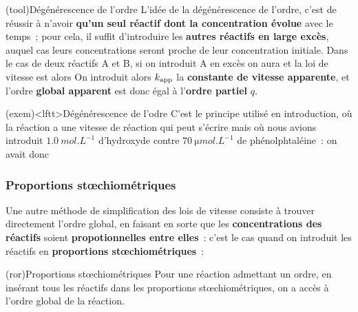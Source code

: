 \documentclass[../../main/main.tex]{subfiles}
\begin{document}
\begin{tcb*}(tool){Dégénérescence de l'ordre}
	L'idée de la dégénérescence de l'ordre, c'est de réussir à n'avoir
	\textbf{qu'un seul réactif dont la concentration évolue} avec le temps~; pour
	cela, il suffit d'introduire les \textbf{autres réactifs en large excès},
	auquel cas leurs concentrations seront proche de leur concentration initiale.
	\smallbreak
	Dans le cas de deux réactifs A et B, si on introduit A en excès on aura
	\psw{%
		\[[\ce{A}](t) \approx [\ce{A}]_0\]
	}%
	et la loi de vitesse est alors
	\psw{%
	\[
		\boxed{
		v =
		k[\ce{A}]^{p}[\ce{B}]^{q} =
		\underbracket[1pt]{k[\ce{A}]_0{}^{p}}_{= \cte}[\ce{B}]^{q} =
		k_{\rm app}[\ce{B}]^{q}
		}%
	\]
	}%
	On introduit alors $k_{\rm app}$ la \textbf{constante de vitesse apparente},
	et l'ordre \textbf{global apparent} est donc égal à l'\textbf{ordre partiel}
	$q$.
\end{tcb*}

\begin{tcb}(exem)<lftt>{Dégénérescence de l'odre}
	C'est le principe utilisé en introduction, où la réaction
	\psw{%
		\[\ce{Ph^{2-}_{\aqu} + HO^{-}_{\aqu} = PhOH^{-3}_{\aqu}}\]
	}%
	a une vitesse de réaction qui peut s'écrire
	\psw{%
		\[v = k[\ce{HO^{-}}]^{p}[\ce{Ph^{2-}}]^{q}\]
	}%
	mais où nous avions introduit $\SI{1.0}{mol.L^{-1}}$ d'hydroxyde contre
	$\SI{70}{\micro mol.L^{-1}}$ de phénolphtaléine~: on avait donc
	\psw{%
	\[
		\boxed{k_{\rm app} = k[\ce{HO^{-}}]_0^{p}}
	\]
	}%
	\vspace{-15pt}
\end{tcb}

\subsubsection{Proportions stœchiométriques}

Une autre méthode de simplification des lois de vitesse consiste à trouver
directement l'ordre global, en faisant en sorte que les \textbf{concentrations
	des réactifs} soient \textbf{propotionnelles entre elles}~: c'est le cas quand
on introduit les réactifs en \textbf{proportions stœchiométriques}~:

\begin{tcb}[label=prop:stoe, bld, cnt](ror){Proportions stœchiométriques}
	Pour une réaction admettant un ordre, en insérant tous les réactifs dans les
	proportions stœchiométriques, on a accès à l'ordre global de la réaction.
\end{tcb}
\end{document}
